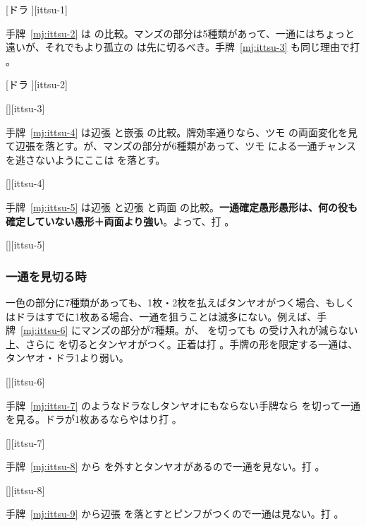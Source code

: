 \documentclass[../nankiru_main.tex]{subfiles}
\begin{document}
[ドラ ][ittsu-1]

手牌~\ref{mj:ittsu-2} は  の比較。マンズの部分は5種類があって、一通にはちょっと遠いが、それでもより孤立の  は先に切るべき。手牌~\ref{mj:ittsu-3} も同じ理由で打  \citep[][p.~69]{zero-teyaku}。

[ドラ ][ittsu-2]

[][ittsu-3]

手牌~\ref{mj:ittsu-4} は辺張  と嵌張  の比較。牌効率通りなら、ツモ  の両面変化を見て辺張を落とす。が、マンズの部分が6種類があって、ツモ  による一通チャンスを逃さないようにここは  を落とす\citep[][pp.~68--69]{zero-teyaku}。

[][ittsu-4]

手牌~\ref{mj:ittsu-5} は辺張  と辺張  と両面  の比較。\textbf{一通確定愚形愚形は、何の役も確定していない愚形＋両面より強い}\citep{gendai-ittsu}。よって、打 。

[][ittsu-5]


\subsubsection*{一通を見切る時}

一色の部分に7種類があっても、1枚・2枚を払えばタンヤオがつく場合、もしくはドラはすでに1枚ある場合、一通を狙うことは滅多にない。例えば、手牌~\ref{mj:ittsu-6} にマンズの部分が7種類。が、 を切っても  の受け入れが減らない上、さらに  を切るとタンヤオがつく。正着は打 。手牌の形を限定する一通は、タンヤオ・ドラ1より弱い\citep[][p.~69]{zero-teyaku}。

[][ittsu-6]

手牌~\ref{mj:ittsu-7} のようなドラなしタンヤオにもならない手牌なら  を切って一通を見る。ドラが1枚あるならやはり打  \citep[][p.~70]{zero-teyaku}。

[][ittsu-7]

手牌~\ref{mj:ittsu-8} から  を外すとタンヤオがあるので一通を見ない。打  \citep[][p.~70]{zero-teyaku}。

[][ittsu-8]

手牌~\ref{mj:ittsu-9} から辺張  を落とすとピンフがつくので一通は見ない。打  \citep{gendai-ittsu}。
\end{document}
